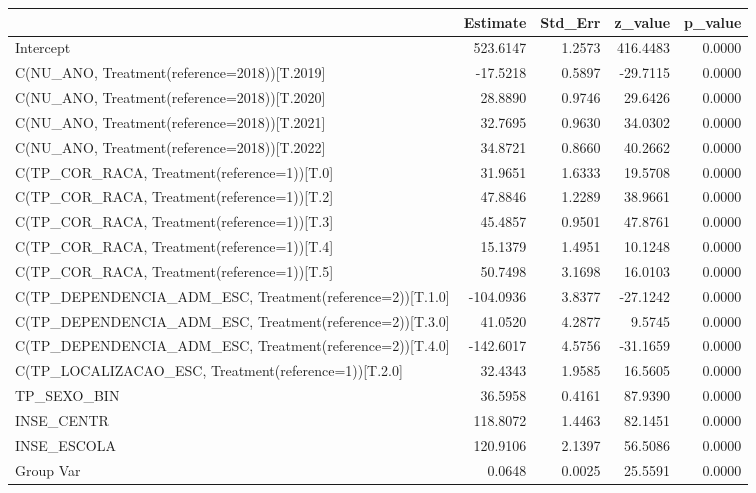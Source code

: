 \begin{tabular}{lrrrr}
\toprule
 & Estimate & Std_Err & z_value & p_value \\
\midrule
Intercept & 523.6147 & 1.2573 & 416.4483 & 0.0000 \\
C(NU_ANO, Treatment(reference=2018))[T.2019] & -17.5218 & 0.5897 & -29.7115 & 0.0000 \\
C(NU_ANO, Treatment(reference=2018))[T.2020] & 28.8890 & 0.9746 & 29.6426 & 0.0000 \\
C(NU_ANO, Treatment(reference=2018))[T.2021] & 32.7695 & 0.9630 & 34.0302 & 0.0000 \\
C(NU_ANO, Treatment(reference=2018))[T.2022] & 34.8721 & 0.8660 & 40.2662 & 0.0000 \\
C(TP_COR_RACA, Treatment(reference=1))[T.0] & 31.9651 & 1.6333 & 19.5708 & 0.0000 \\
C(TP_COR_RACA, Treatment(reference=1))[T.2] & 47.8846 & 1.2289 & 38.9661 & 0.0000 \\
C(TP_COR_RACA, Treatment(reference=1))[T.3] & 45.4857 & 0.9501 & 47.8761 & 0.0000 \\
C(TP_COR_RACA, Treatment(reference=1))[T.4] & 15.1379 & 1.4951 & 10.1248 & 0.0000 \\
C(TP_COR_RACA, Treatment(reference=1))[T.5] & 50.7498 & 3.1698 & 16.0103 & 0.0000 \\
C(TP_DEPENDENCIA_ADM_ESC, Treatment(reference=2))[T.1.0] & -104.0936 & 3.8377 & -27.1242 & 0.0000 \\
C(TP_DEPENDENCIA_ADM_ESC, Treatment(reference=2))[T.3.0] & 41.0520 & 4.2877 & 9.5745 & 0.0000 \\
C(TP_DEPENDENCIA_ADM_ESC, Treatment(reference=2))[T.4.0] & -142.6017 & 4.5756 & -31.1659 & 0.0000 \\
C(TP_LOCALIZACAO_ESC, Treatment(reference=1))[T.2.0] & 32.4343 & 1.9585 & 16.5605 & 0.0000 \\
TP_SEXO_BIN & 36.5958 & 0.4161 & 87.9390 & 0.0000 \\
INSE_CENTR & 118.8072 & 1.4463 & 82.1451 & 0.0000 \\
INSE_ESCOLA & 120.9106 & 2.1397 & 56.5086 & 0.0000 \\
Group Var & 0.0648 & 0.0025 & 25.5591 & 0.0000 \\
\bottomrule
\end{tabular}
